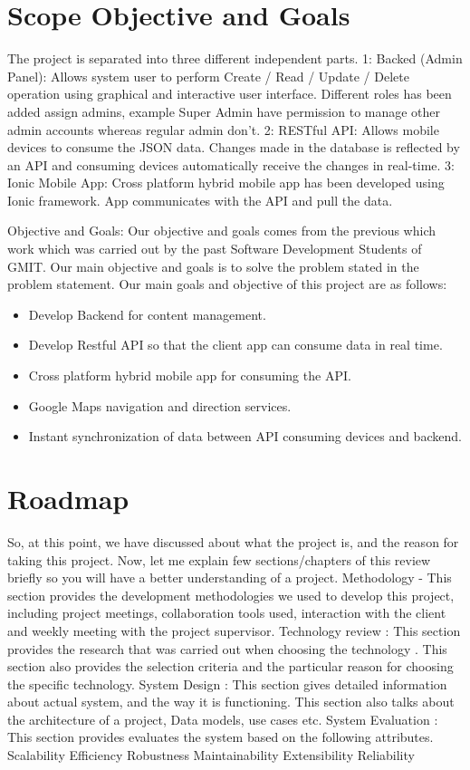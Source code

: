 	\section {Scope Objective and Goals}
	The project is separated into three different independent parts.
	1: Backed (Admin Panel): Allows system user to perform Create / Read / Update / Delete operation using graphical and interactive user interface. Different roles has been added assign admins, example Super Admin have permission to manage other admin accounts whereas regular admin don’t.
	2: RESTful API: Allows mobile devices to consume the JSON data. Changes made in the database is reflected by an API and consuming devices automatically receive the changes in real-time.
	3: Ionic Mobile App: Cross platform hybrid mobile app has been developed using Ionic framework.  App communicates with the API and pull the data.
	
	 Objective and Goals: Our objective and goals comes from the previous which work which was carried out by the past Software Development Students of GMIT. Our main objective and goals is to solve the problem stated in the problem statement. Our main goals and objective of this project are as follows:
	 \begin{itemize}
		 \item Develop Backend for content management.
		\item Develop Restful API so that the client app can consume data in real time. 
		\item Cross platform hybrid mobile app for consuming the API.
		\item Google Maps navigation and direction services.
		\item Instant synchronization of data  between API consuming devices and backend. 
	\end{itemize}
	\section {Roadmap}
	So, at this point, we have discussed about what the project is, and the reason for taking this project. Now, let me explain few sections/chapters of this review briefly so you will have a better understanding of a project.
	Methodology  - This section provides the development methodologies we used to develop this project, including project meetings, collaboration tools used, interaction with the client and weekly meeting with the project supervisor. 
	Technology review : This section provides the research that was carried out when choosing the technology . This section also provides the selection criteria and the particular reason for choosing the specific technology.
	System Design : This section gives detailed information about actual system, and the way it is functioning. This section also talks about the architecture of a project, Data models, use cases etc.  
	System Evaluation : This section provides evaluates the system based on the following attributes.
	Scalability
	Efficiency
	Robustness
	Maintainability
	Extensibility 
	Reliability 
	
